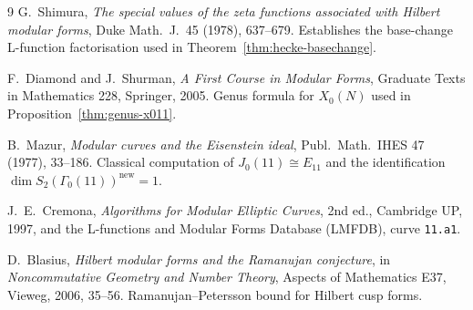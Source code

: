 \documentclass[11pt,a4paper]{article}
\theoremstyle{plain}
\theoremstyle{definition}
\theoremstyle{remark}
\numberwithin{equation}{section}
\begin{document}
\begin{thebibliography}{9}
  G.\ Shimura,
  \emph{The special values of the zeta functions associated with Hilbert
  modular forms}, Duke Math.\ J.\ 45 (1978), 637--679.  Establishes the
  base-change L-function factorisation used in Theorem~\ref{thm:hecke-basechange}.

  F.\ Diamond and J.\ Shurman,
  \emph{A First Course in Modular Forms}, Graduate Texts in Mathematics 228,
  Springer, 2005.  Genus formula for $X_{0}(N)$ used in Proposition~\ref{thm:genus-x011}.

  B.\ Mazur,
  \emph{Modular curves and the Eisenstein ideal}, Publ.\ Math.\ IHES 47 (1977), 33--186.
  Classical computation of $J_{0}(11)\cong E_{11}$ and the identification
  $\dim S_{2}(\Gamma_{0}(11))^{\mathrm{new}}=1$.

  J.\ E.\ Cremona,
  \emph{Algorithms for Modular Elliptic Curves}, 2nd ed., Cambridge UP, 1997,
  and the L-functions and Modular Forms Database (LMFDB), curve \texttt{11.a1}.

  D.\ Blasius,
  \emph{Hilbert modular forms and the Ramanujan conjecture}, in
  \emph{Noncommutative Geometry and Number Theory}, Aspects of Mathematics E37,
  Vieweg, 2006, 35--56.  Ramanujan--Petersson bound for Hilbert cusp forms.

\end{thebibliography}
\end{document}
